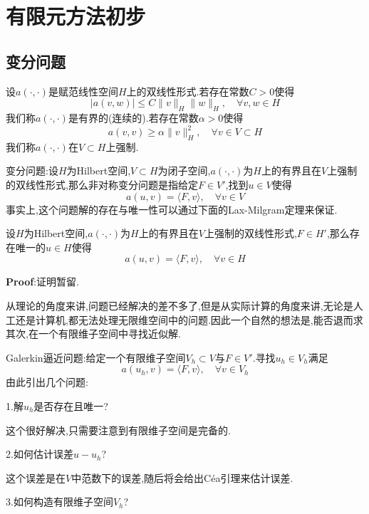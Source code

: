 \newpage
\section{有限元方法初步}
\subsection{变分问题}
设$a(\cdot,\cdot)$是赋范线性空间$H$上的双线性形式.若存在常数$C>0$使得
$$
|a(v,w)|\leqslant C\|v\|_H\|w\|_H,\quad \forall v,w\in H
$$
我们称$a(\cdot,\cdot)$是有界的(连续的).若存在常数$\alpha >0$使得
$$
a(v,v)\geqslant \alpha \|v\|^2_H,\quad \forall v\in V\subset H
$$
我们称$a(\cdot,\cdot)$在$V\subset H$上强制.\par
变分问题:设$H$为Hilbert空间,$V\subset H$为闭子空间,$a(\cdot,\cdot)$为$H$上的有界且在$V$上强制的双线性形式,那么非对称变分问题是指给定$F\in V'$,找到$u\in V$使得
\begin{equation}
    a(u,v)=\langle F,v\rangle,\quad \forall v\in V
    \label{eq:2.6.2}
\end{equation}
事实上,这个问题解的存在与唯一性可以通过下面的Lax-Milgram定理来保证.\par
\begin{tcolorbox}[colback=KuangNei,colframe=BianKuang,title=\textbf{Lax-Milgram定理},sharpish corners]
    设$H$为Hilbert空间,$a(\cdot,\cdot)$为$H$上的有界且在$V$上强制的双线性形式,$F\in H'$,那么存在唯一的$u\in H$使得
    $$
    a(u,v)=\langle F,v\rangle,\quad \forall v\in H
    $$
\end{tcolorbox}
\textbf{Proof}:证明暂留.\par
从理论的角度来讲,问题已经解决的差不多了,但是从实际计算的角度来讲,无论是人工还是计算机,都无法处理无限维空间中的问题.因此一个自然的想法是,能否退而求其次,在一个有限维子空间中寻找近似解.\par
Galerkin逼近问题:给定一个有限维子空间$V_h\subset V$与$F\in V'$.寻找$u_h\in V_h$满足
\begin{equation}
    a(u_h,v)=\langle F,v\rangle,\quad \forall v\in V_h
    \label{eq:2.6.3}
\end{equation}
由此引出几个问题:\par
1.解$u_h$是否存在且唯一?\par
这个很好解决,只需要注意到有限维子空间是完备的.\par
2.如何估计误差$u-u_h$?\par
这个误差是在$V$中范数下的误差,随后将会给出Céa引理来估计误差.\par
3.如何构造有限维子空间$V_h$?\par
